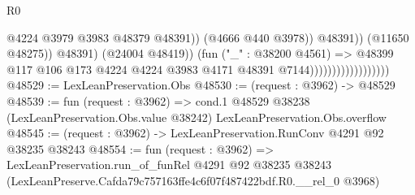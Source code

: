\begin{lexlean}{R0}
\begin{coremodule}
                                                      @4224
                                                      @3979
                                                      @3983
                                                      @48379
                                                      @48391))
                                                  (@4666 @440 @3978))
                                                @48391))
                                            (@11650 @48275))
                                          @48391)
                                        (@24004 @48419))
                                      (fun ("_" : @38200 @4561) =>
                                      @48399
                                        @117
                                        @106
                                        @173
                                        @4224
                                        @4224
                                        @3983
                                        @4171
                                        @48391
                                        @7144))))))))))))))))))
@48529 := LexLeanPreservation.Obs
@48530 := (request : @3962) -> @48529
@48539 := fun (request : @3962) =>
  cond.{1} @48529 @38238 (LexLeanPreservation.Obs.value @38242) LexLeanPreservation.Obs.overflow
@48545 := (request : @3962) -> LexLeanPreservation.RunConv @4291 @92 @38235 @38243
@48554 := fun (request : @3962) =>
  LexLeanPreservation.run_of_funRel
    @4291
    @92
    @38235
    @38243
    (LexLeanPreserve.Cafda79c757163ffe4c6f07f487422bdf.R0.__rel_0 @3968)
\end{coremodule}
\end{lexlean}
